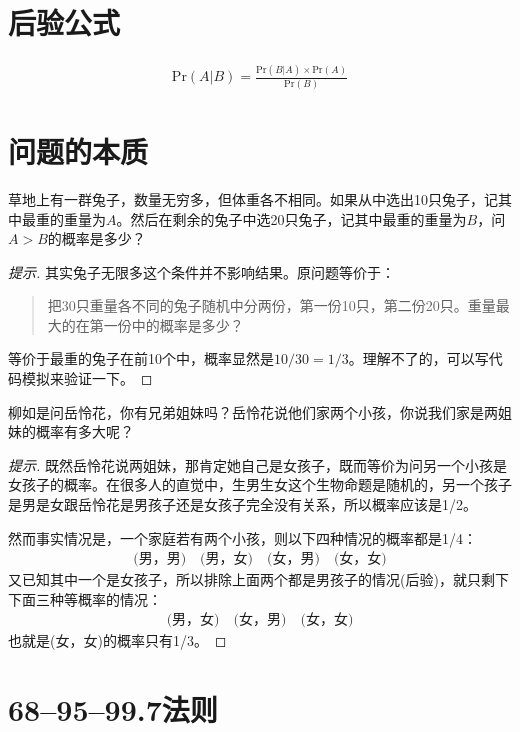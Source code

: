 \section{后验公式}
\label{sec:bayes-theorem}

\begin{theorem}
  \begin{align*}
    \mathrm{Pr}(A|B)=\frac{\mathrm{Pr}(B|A)\times \mathrm{Pr}(A)}{\mathrm{Pr}(B)}
  \end{align*}
\end{theorem}

\section{问题的本质}
\label{sec:equivalent-problem}

\begin{example}
  草地上有一群兔子，数量无穷多，但体重各不相同。如果从中选出10只兔子，记其中最重的重量为$A$。然后在剩余的兔子中选20只兔子，记其中最重的重量为$B$，问$A>B$的概率是多少？
\end{example}
\begin{proof}[提示]
  其实兔子无限多这个条件并不影响结果。原问题等价于：
  \begin{quotation}
    把30只重量各不同的兔子随机中分两份，第一份10只，第二份20只。重量最大的在第一份中的概率是多少？
  \end{quotation}
  等价于最重的兔子在前10个中，概率显然是$10/30=1/3$。理解不了的，可以写代码模拟来验证一下。
\end{proof}

\begin{example}
  柳如是问岳怜花，你有兄弟姐妹吗？岳怜花说他们家两个小孩，你说我们家是两姐妹的概率有多大呢？
\end{example}
\begin{proof}[提示]
  既然岳怜花说两姐妹，那肯定她自己是女孩子，既而等价为问另一个小孩是女孩子的概率。在很多人的直觉中，生男生女这个生物命题是随机的，另一个孩子是男是女跟岳怜花是男孩子还是女孩子完全没有关系，所以概率应该是1/2。

  然而事实情况是，一个家庭若有两个小孩，则以下四种情况的概率都是1/4：
  \begin{align*}
    \text{(男，男)}\quad \text{(男，女)}\quad \text{(女，男)}\quad \text{(女，女)}
  \end{align*}
  又已知其中一个是女孩子，所以排除上面两个都是男孩子的情况(后验)，就只剩下下面三种等概率的情况：
  \begin{align*}
    \text{(男，女)}\quad \text{(女，男)}\quad \text{(女，女)}
  \end{align*}
  也就是(女，女)的概率只有1/3。
\end{proof}

\section{68--95--99.7法则}
\label{sec:68-95-99.7-rule}
\begin{definition}
  
\end{definition}

\begin{theorem}[68--95--99.7法则]
  
\end{theorem}